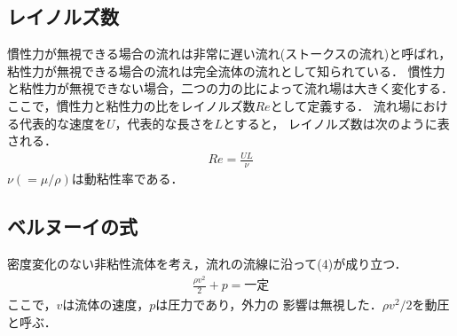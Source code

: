 \documentclass[twocolumn,10pt,a4j]{jsarticle}
\begin{document}
  \subsection{レイノルズ数}
      慣性力が無視できる場合の流れは非常に遅い流れ(ストークスの流れ)と呼ばれ，
    粘性力が無視できる場合の流れは完全流体の流れとして知られている．
    慣性力と粘性力が無視できない場合，二つの力の比によって流れ場は大きく変化する．
    ここで，慣性力と粘性力の比をレイノルズ数$Re$として定義する．
    流れ場における代表的な速度を$U$，代表的な長さを$L$とすると，
    レイノルズ数は次のように表される．
    \begin{eqnarray}
      Re = \frac{UL}{\nu}
    \end{eqnarray}
    $\nu(= \mu / \rho)$は動粘性率である．
  \subsection{ベルヌーイの式}
    密度変化のない非粘性流体を考え，流れの流線に沿って(4)が成り立つ．
      \begin{eqnarray}
        \frac{\rho v^2}{2} + p = 一定
      \end{eqnarray}
    ここで，$v$は流体の速度，$p$は圧力であり，外力の
    影響は無視した．$\rho v^2 / 2$を動圧と呼ぶ．
\end{document}
